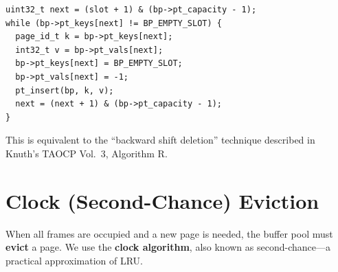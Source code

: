 \documentclass[12pt, a4paper]{report}
\begin{document}
\begin{lstlisting}
uint32_t next = (slot + 1) & (bp->pt_capacity - 1);
while (bp->pt_keys[next] != BP_EMPTY_SLOT) {
  page_id_t k = bp->pt_keys[next];
  int32_t v = bp->pt_vals[next];
  bp->pt_keys[next] = BP_EMPTY_SLOT;
  bp->pt_vals[next] = -1;
  pt_insert(bp, k, v);
  next = (next + 1) & (bp->pt_capacity - 1);
}
\end{lstlisting}

This is equivalent to the ``backward shift deletion'' technique described
in Knuth's TAOCP Vol.~3, Algorithm R.


\section{Clock (Second-Chance) Eviction}

When all frames are occupied and a new page is needed, the buffer pool must
\textbf{evict} a page. We use the \textbf{clock algorithm}, also known as
second-chance---a practical approximation of LRU.

\begin{center}
\end{center}
\end{document}
